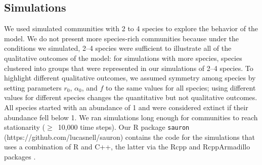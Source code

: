 \subsection*{Simulations}

We used simulated communities with 2 to 4 species to explore the behavior 
of the model. We do not present more species-rich communities because under 
the conditions we simulated, 2--4 species were sufficient to illustrate all 
of the qualitative outcomes of the model: for simulations with more species,
species clustered into groups that were represented in our simulations of 
2--4 species. To highlight different qualitative outcomes, we assumed
symmetry among species by setting parameters $r_{0}$, $\alpha_{0}$,
and $f$ to the same values for all species; using different values for
different species changes the quantitative but not qualitative outcomes.
All species started with an abundance of 1 and were considered extinct
if their abundance fell below 1. We ran simulations long enough for
communities to reach stationarity ($\ge$~10,000 time steps). 
Our R package
\texttt{sauron}
(https://github.com/lucasnell/sauron) 
contains the code for the simulations that uses a combination of R
\citep{RCoreTeam2022} and C++, the latter via the Rcpp and
RcppArmadillo packages \citep{Eddelbuettel2014a, Eddelbuettel2013a,
Sanderson2016}.


